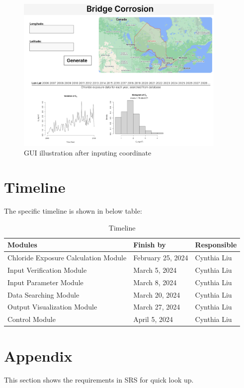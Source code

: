 \documentclass[12pt, titlepage]{article}
\begin{document}
\begin{figure}[H]
\centering
\includegraphics[width=0.9\textwidth]{GUI2.png}
\caption{GUI illustration after inputing coordinate}
\label{FigGUI1}
\end{figure}

\section{Timeline}
The specific timeline is shown in below table:
\begin{table}[H]
\centering
\begin{tabular}{p{} p{}  p{}}
\toprule
 \textbf{Modules} & \textbf{Finish by} & \textbf{Responsible} \\
\midrule
Chloride Exposure Calculation Module & February 25, 2024& Cynthia Liu\\
Input Verification Module & March 5, 2024 & Cynthia Liu\\
Input Parameter Module & March 8, 2024 & Cynthia Liu\\
Data Searching Module & March 20, 2024 & Cynthia Liu\\
Output Visualization Module  & March 27, 2024 & Cynthia Liu\\
Control Module & April 5, 2024 & Cynthia Liu\\

\bottomrule
\end{tabular}
\caption{Timeline}
\end{table}


\section{Appendix}
This section shows the requirements in SRS for quick look up.
\end{document}
